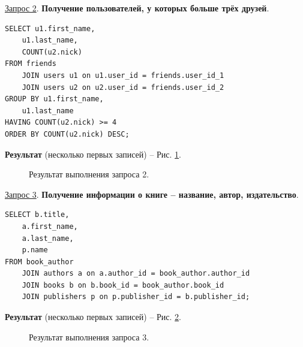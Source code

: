 \documentclass[a4paper,12pt]{article}
\begin{document}
\underline{Запрос 2}. \textbf{Получение пользователей, у которых больше трёх друзей}.
\begin{lstlisting}
SELECT u1.first_name,
    u1.last_name,
    COUNT(u2.nick)
FROM friends
    JOIN users u1 on u1.user_id = friends.user_id_1
    JOIN users u2 on u2.user_id = friends.user_id_2
GROUP BY u1.first_name,
    u1.last_name
HAVING COUNT(u2.nick) >= 4
ORDER BY COUNT(u2.nick) DESC;
    \end{lstlisting}

\textbf{Результат} (несколько первых записей) -- Рис. \ref{fig:request2}.

\begin{figure}[ht]
    \caption{Результат выполнения запроса 2.}
    \label{fig:request2}
\end{figure}

\underline{Запрос 3}. \textbf{Получение информации о книге -- название, автор, издательство}.
\begin{lstlisting}
SELECT b.title,
    a.first_name,
    a.last_name,
    p.name
FROM book_author
    JOIN authors a on a.author_id = book_author.author_id
    JOIN books b on b.book_id = book_author.book_id
    JOIN publishers p on p.publisher_id = b.publisher_id;
    \end{lstlisting}

\textbf{Результат} (несколько первых записей) -- Рис. \ref{fig:request3}.

\begin{figure}[ht]
    \caption{Результат выполнения запроса 3.}
    \label{fig:request3}
\end{figure}
\end{document}
